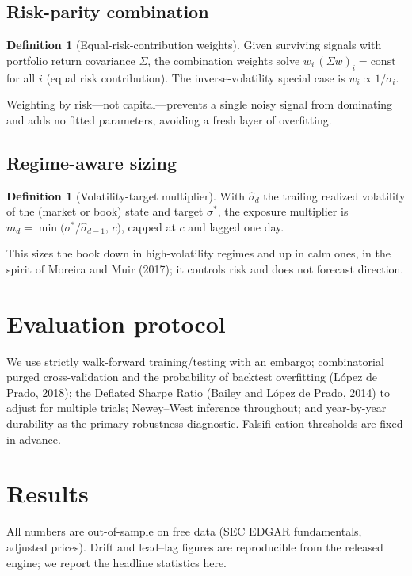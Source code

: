 \documentclass[11pt,a4paper]{article}
\theoremstyle{plain}
\theoremstyle{definition}
\newtheorem{definition}[theorem]{Definition}
\begin{document}
\subsection{Risk-parity combination}
\begin{definition}[Equal-risk-contribution weights]\label{def:erc}
Given surviving signals with portfolio return covariance $\Sigma$, the combination weights solve
$w_i\,(\Sigma w)_i=\text{const}$ for all $i$ (equal risk contribution). The inverse-volatility
special case is $w_i\propto 1/\sigma_i$.
\end{definition}
Weighting by risk---not capital---prevents a single noisy signal from dominating and adds no fitted
parameters, avoiding a fresh layer of overfitting.

\subsection{Regime-aware sizing}
\begin{definition}[Volatility-target multiplier]\label{def:regime}
With $\hat\sigma_d$ the trailing realized volatility of the (market or book) state and target
$\sigma^\ast$, the exposure multiplier is
$m_d=\min\!\bigl(\sigma^\ast/\hat\sigma_{d-1},\,c\bigr)$, capped at $c$ and lagged one day.
\end{definition}
This sizes the book down in high-volatility regimes and up in calm ones, in the spirit of Moreira
and Muir (2017); it controls risk and does not forecast direction.

\section{Evaluation protocol}
\label{sec:eval}
We use strictly walk-forward training/testing with an embargo; combinatorial purged
cross-validation and the probability of backtest overfitting (L\'opez de Prado, 2018); the Deflated
Sharpe Ratio (Bailey and L\'opez de Prado, 2014) to adjust for multiple trials; Newey--West
inference throughout; and year-by-year durability as the primary robustness diagnostic. Falsifi
cation thresholds are fixed in advance.

\section{Results}
\label{sec:results}
All numbers are out-of-sample on free data (SEC EDGAR fundamentals, adjusted prices). Drift and
lead--lag figures are reproducible from the released engine; we report the headline statistics here.
\end{document}
